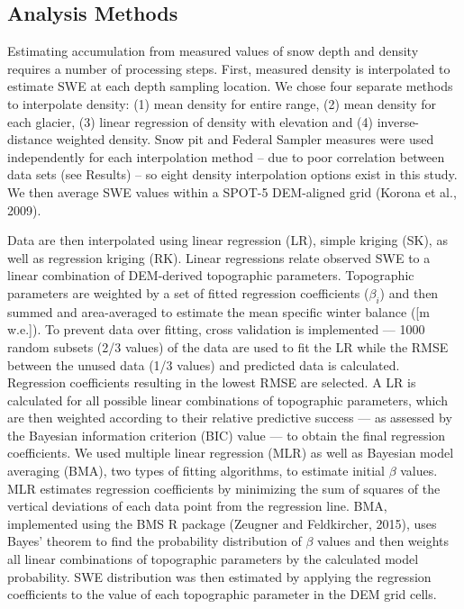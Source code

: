 \documentclass[twoside,twocolumn]{article}
\begin{document}
\subsection{Analysis Methods}

Estimating accumulation from measured values of snow depth and density requires a number of processing steps. First, measured density is interpolated to estimate SWE at each depth sampling location. We chose four separate methods to interpolate density: (1) mean density for entire range, (2) mean density for each glacier, (3)  linear regression of density with elevation and (4) inverse-distance weighted density. Snow pit and Federal Sampler measures were used independently for each interpolation method -- due to poor correlation between data sets (see Results) -- so eight density interpolation options exist in this study. We then average SWE values within a SPOT-5 DEM-aligned grid (Korona et al., 2009). 

Data are then interpolated using linear regression (LR), simple kriging (SK), as well as regression kriging (RK). Linear regressions relate observed SWE to a linear combination of DEM-derived topographic parameters. Topographic parameters are weighted by a set of fitted regression coefficients ($\beta_i$) and then summed and area-averaged to estimate the mean specific winter balance ([m w.e.]). To prevent data over fitting, cross validation is implemented --- 1000 random subsets (2/3 values) of the data are used to fit the LR while the RMSE between the unused data (1/3 values) and predicted data is calculated. Regression coefficients resulting in the lowest RMSE are selected. A LR is calculated for all possible linear combinations of topographic parameters, which are then weighted according to their relative predictive success --- as assessed by the Bayesian information criterion (BIC) value --- to obtain the final regression coefficients. We used multiple linear regression (MLR) as well as Bayesian model averaging (BMA), two types of fitting algorithms, to estimate initial $\beta$ values. MLR estimates regression coefficients by minimizing the sum of squares of the vertical deviations of each data point from the regression line. BMA, implemented using the BMS R package (Zeugner and Feldkircher, 2015), uses Bayes' theorem to find the probability distribution of $\beta$ values and then weights all linear combinations of topographic parameters by the calculated model probability. SWE distribution was then estimated by applying the regression coefficients to the value of each topographic parameter in the DEM grid cells. 
\end{document}
